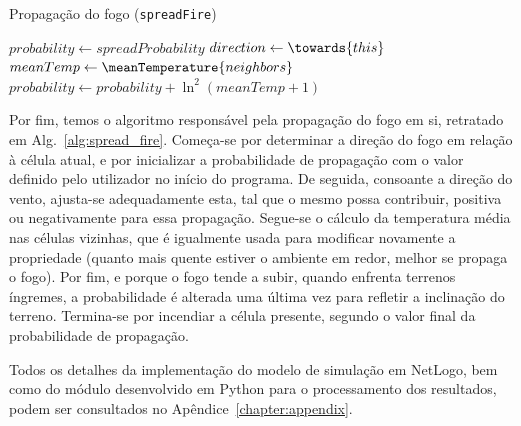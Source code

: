 \begin{algorithm}
    \caption{Propagação do fogo (\texttt{spreadFire})}\label{alg:spread_fire}
    $probability \gets spreadProbability$\;
    $direction \gets \towards{this}$\;
    $meanTemp \gets \meanTemperature{neighbors}$\;
    $probability \gets probability + \ln^2{(meanTemp + 1)}$\;
\end{algorithm}

Por fim, temos o algoritmo responsável pela propagação do fogo em si, retratado em Alg.~\ref{alg:spread_fire}. Começa-se por determinar a direção do fogo em relação à célula atual, e por inicializar a probabilidade de propagação com o valor definido pelo utilizador no início do programa. De seguida, consoante a direção do vento, ajusta-se adequadamente esta, tal que o mesmo possa contribuir, positiva ou negativamente para essa propagação. Segue-se o cálculo da temperatura média nas células vizinhas, que é igualmente usada para modificar novamente a propriedade (quanto mais quente estiver o ambiente em redor, melhor se propaga o fogo). Por fim, e porque o fogo tende a subir, quando enfrenta terrenos íngremes, a probabilidade é alterada uma última vez para refletir a inclinação do terreno. Termina-se por incendiar a célula presente, segundo o valor final da probabilidade de propagação.

Todos os detalhes da implementação do modelo de simulação em NetLogo, bem como do módulo desenvolvido em Python para o processamento dos resultados, podem ser consultados no Apêndice~\ref{chapter:appendix}.